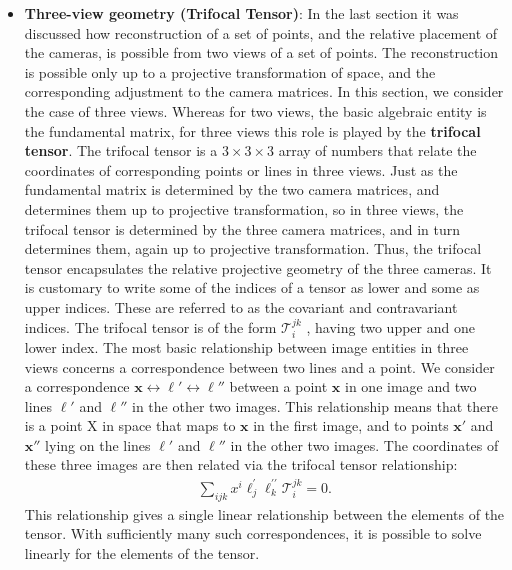 \documentclass{report}
\begin{document}
\begin{itemize}
        \item \textbf{Three-view geometry (Trifocal Tensor)}: In the last section it was discussed how reconstruction of a set of points, and the relative placement of the cameras, is possible from two views of a set of points. The reconstruction is possible only up to a projective transformation of space, and the corresponding adjustment to the camera matrices.
            \bigbreak \noindent 
            In this section, we consider the case of three views. Whereas for two views, the basic algebraic entity is the fundamental matrix, for three views this role is played by the \textbf{trifocal tensor}.
            \bigbreak \noindent 
            The trifocal tensor is a $3\times 3\times 3$ array of numbers that relate the coordinates of corresponding points or lines in three views.
            \bigbreak \noindent 
            Just as the fundamental matrix is determined by the two camera matrices, and determines them up to projective transformation, so in three views, the trifocal tensor is determined by the three camera matrices, and in turn determines them, again up to projective transformation. Thus, the trifocal tensor encapsulates the relative projective geometry of the three cameras.
            \bigbreak \noindent 
            It is customary to write some of the indices of a tensor as lower and some as upper indices. These are referred to as the covariant and contravariant indices. The trifocal tensor is of the form $\mathcal{T}_{i}^{jk}$ , having two upper and one lower index.
            \bigbreak \noindent 
            The most basic relationship between image entities in three views concerns a correspondence between two lines and a point. We consider a correspondence $\mathbf{x}\leftrightarrow \mathbf{\ell}'\leftrightarrow \ell''$ between a point $\mathbf{x}$ in one image and two lines $\ell'$ and $\ell''$ in the other two images. This relationship means that there is a point X in space that maps to $\mathbf{x}$ in the first image, and to points $\mathbf{x}'$ and $\mathbf{x}''$ lying on the lines $\ell'$ and $\ell''$ in the other two images. The coordinates of these three images are then related via the trifocal tensor relationship:
            \begin{align*}
                \sum_{ijk} x^{i}\mathbf{\ell}_{j}^{\prime}\ell_{k}^{\prime\prime}\mathcal{T}_{i}^{jk} = 0
            .\end{align*}
            This relationship gives a single linear relationship between the elements of the tensor. With sufficiently many such correspondences, it is possible to solve linearly for the elements of the tensor.

\end{itemize}
\end{document}

